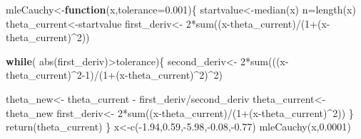 \documentclass[
]{book}
\newenvironment{Shaded}{\begin{snugshade}}{\end{snugshade}}
\newcommand{\AttributeTok}[1]{\textcolor[rgb]{0.77,0.63,0.00}{#1}}
\newcommand{\ControlFlowTok}[1]{\textcolor[rgb]{0.13,0.29,0.53}{\textbf{#1}}}
\newcommand{\DecValTok}[1]{\textcolor[rgb]{0.00,0.00,0.81}{#1}}
\newcommand{\FloatTok}[1]{\textcolor[rgb]{0.00,0.00,0.81}{#1}}
\newcommand{\FunctionTok}[1]{\textcolor[rgb]{0.00,0.00,0.00}{#1}}
\newcommand{\NormalTok}[1]{#1}
\newcommand{\OtherTok}[1]{\textcolor[rgb]{0.56,0.35,0.01}{#1}}
\newcommand{\SpecialCharTok}[1]{\textcolor[rgb]{0.00,0.00,0.00}{#1}}
\theoremstyle{definition}
\theoremstyle{definition}
\theoremstyle{definition}
\theoremstyle{definition}
\theoremstyle{remark}
\begin{document}
\begin{Shaded}
\begin{Highlighting}[]
\NormalTok{mleCauchy}\OtherTok{\textless{}{-}}\ControlFlowTok{function}\NormalTok{(x,}\AttributeTok{tolerance=}\FloatTok{0.001}\NormalTok{)\{}
\NormalTok{  startvalue}\OtherTok{\textless{}{-}}\FunctionTok{median}\NormalTok{(x)}
\NormalTok{  n}\OtherTok{=}\FunctionTok{length}\NormalTok{(x)}
\NormalTok{  theta\_current}\OtherTok{\textless{}{-}}\NormalTok{startvalue}
\NormalTok{  first\_deriv}\OtherTok{\textless{}{-}} \DecValTok{2}\SpecialCharTok{*}\FunctionTok{sum}\NormalTok{((x}\SpecialCharTok{{-}}\NormalTok{theta\_current)}\SpecialCharTok{/}\NormalTok{(}\DecValTok{1}\SpecialCharTok{+}\NormalTok{(x}\SpecialCharTok{{-}}\NormalTok{theta\_current)}\SpecialCharTok{\^{}}\DecValTok{2}\NormalTok{))}
  
  \ControlFlowTok{while}\NormalTok{( }\FunctionTok{abs}\NormalTok{(first\_deriv)}\SpecialCharTok{\textgreater{}}\NormalTok{tolerance)\{}
\NormalTok{  second\_deriv}\OtherTok{\textless{}{-}} \DecValTok{2}\SpecialCharTok{*}\FunctionTok{sum}\NormalTok{(((x}\SpecialCharTok{{-}}\NormalTok{theta\_current)}\SpecialCharTok{\^{}}\DecValTok{2{-}1}\NormalTok{)}\SpecialCharTok{/}\NormalTok{(}\DecValTok{1}\SpecialCharTok{+}\NormalTok{(x}\SpecialCharTok{{-}}\NormalTok{theta\_current)}\SpecialCharTok{\^{}}\DecValTok{2}\NormalTok{)}\SpecialCharTok{\^{}}\DecValTok{2}\NormalTok{)}
  
\NormalTok{  theta\_new}\OtherTok{\textless{}{-}}\NormalTok{  theta\_current }\SpecialCharTok{{-}}\NormalTok{ first\_deriv}\SpecialCharTok{/}\NormalTok{second\_deriv}
\NormalTok{  theta\_current}\OtherTok{\textless{}{-}}\NormalTok{theta\_new}
\NormalTok{  first\_deriv}\OtherTok{\textless{}{-}} \DecValTok{2}\SpecialCharTok{*}\FunctionTok{sum}\NormalTok{((x}\SpecialCharTok{{-}}\NormalTok{theta\_current)}\SpecialCharTok{/}\NormalTok{(}\DecValTok{1}\SpecialCharTok{+}\NormalTok{(x}\SpecialCharTok{{-}}\NormalTok{theta\_current)}\SpecialCharTok{\^{}}\DecValTok{2}\NormalTok{))}
\NormalTok{  \}}
  \FunctionTok{return}\NormalTok{(theta\_current)}
\NormalTok{\}}
\NormalTok{x}\OtherTok{\textless{}{-}}\FunctionTok{c}\NormalTok{(}\SpecialCharTok{{-}}\FloatTok{1.94}\NormalTok{,}\FloatTok{0.59}\NormalTok{,}\SpecialCharTok{{-}}\FloatTok{5.98}\NormalTok{,}\SpecialCharTok{{-}}\FloatTok{0.08}\NormalTok{,}\SpecialCharTok{{-}}\FloatTok{0.77}\NormalTok{)}
\FunctionTok{mleCauchy}\NormalTok{(x,}\FloatTok{0.0001}\NormalTok{)}
\end{Highlighting}
\end{Shaded}
\end{document}

